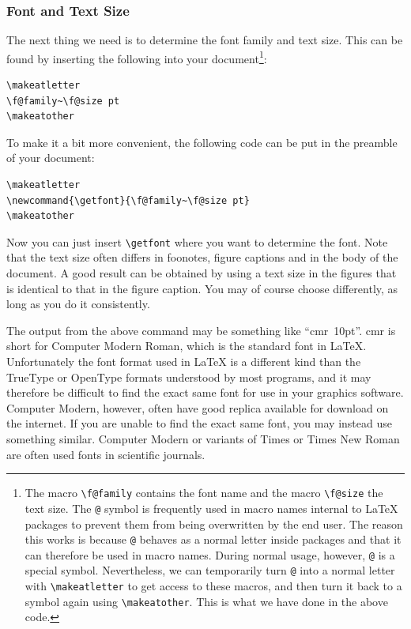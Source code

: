 \documentclass[a4paper,twocolumn]{article}
\makeatletter
\newcommand{\getfont}{\f@family~\f@size pt}
\makeatother
\begin{document}
\subsubsection{Font and Text Size}
The next thing we need is to determine the font family and text size. This can be found by inserting the following into your document\footnote{
The macro \verb|\f@family| contains the font name and the macro \verb|\f@size| the text size. The \verb|@| symbol is frequently used in macro names internal to \LaTeX{} packages to prevent them from being overwritten by the end user.
The reason this works is because \verb|@| behaves as a normal letter inside packages and that it can therefore be used in macro names.
During normal usage, however, \verb|@| is a special symbol.
Nevertheless, we can temporarily turn \verb|@| into a normal letter with \verb|\makeatletter| to get access to these macros, and then turn it back to a symbol again using \verb|\makeatother|.
This is what we have done in the above code.
}:
\begin{verbatim}
\makeatletter
\f@family~\f@size pt
\makeatother
\end{verbatim}
To make it a bit more convenient, the following code can be put in the preamble of your document:
\begin{verbatim}
\makeatletter
\newcommand{\getfont}{\f@family~\f@size pt}
\makeatother
\end{verbatim}
Now you can just insert \verb|\getfont| where you want to determine the font. Note that the text size often differs in foonotes, figure captions and in the body of the document.
A good result can be obtained by using a text size in the figures that is identical to that in the figure caption. You may of course choose differently, as long as you do it consistently.

The output from the above command may be something like ``cmr~10pt''. cmr is short for Computer Modern Roman, which is the standard font in \LaTeX{}.
Unfortunately the font format used in \LaTeX{} is a different kind than the TrueType or OpenType formats understood by most programs, and it may therefore be difficult to find the exact same font for use in your graphics software. Computer Modern, however, often have good replica available for download on the internet. If you are unable to find the exact same font, you may instead use something similar. Computer Modern or variants of Times or Times New Roman are often used fonts in scientific journals.
\end{document}
